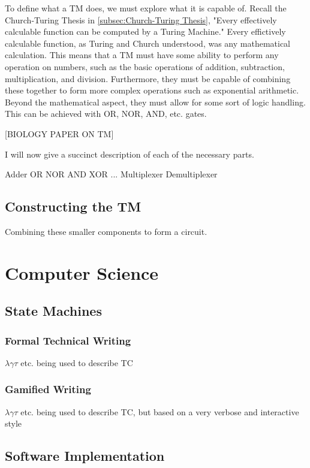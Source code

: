 To define what a TM does, we must explore what it is capable of.
Recall the Church-Turing Thesis in \ref{subsec:Church-Turing Thesis}, "Every effectively calculable function can be computed by a Turing Machine."
Every effictively calculable function, as Turing and Church understood, was any mathematical calculation.
This means that a TM must have some ability to perform any operation on numbers, such as the basic operations of addition, subtraction, multiplication, and division.
Furthermore, they must be capable of combining these together to form more complex operations such as exponential arithmetic.
Beyond the mathematical aspect, they must allow for some sort of logic handling.
This can be achieved with OR, NOR, AND, etc. gates.

[BIOLOGY PAPER ON TM]

I will now give a succinct description of each of the necessary parts.

Adder
OR
NOR
AND
XOR
...
Multiplexer
Demultiplexer

\subsection{Constructing the TM}

Combining these smaller components to form a circuit.

\section{Computer Science}

\subsection{State Machines}

\subsubsection{Formal Technical Writing}

$\lambda \gamma \tau $ etc. being used to describe TC

\subsubsection{Gamified Writing}

$\lambda \gamma \tau $ etc. being used to describe TC, but based on a very verbose and interactive style

\subsection{Software Implementation}

